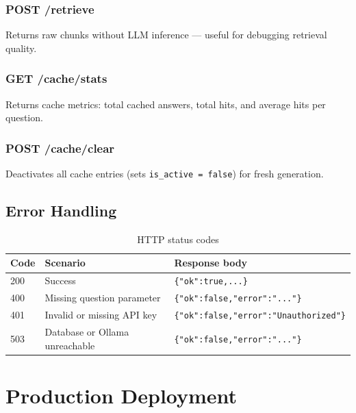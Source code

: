 \documentclass[12pt,a4paper]{report}
\begin{document}
\subsection{POST /retrieve}

Returns raw chunks without LLM inference --- useful for debugging retrieval quality.

\subsection{GET /cache/stats}

Returns cache metrics: total cached answers, total hits, and average hits per question.

\subsection{POST /cache/clear}

Deactivates all cache entries (sets \texttt{is\_active = false}) for fresh generation.

\section{Error Handling}

\begin{table}[H]
\centering
\caption{HTTP status codes}
\begin{tabular}{lll}
\toprule
\textbf{Code} & \textbf{Scenario} & \textbf{Response body} \\
\midrule
200 & Success                       & \texttt{\{"ok":true,...\}} \\
400 & Missing question parameter    & \texttt{\{"ok":false,"error":"..."\}} \\
401 & Invalid or missing API key    & \texttt{\{"ok":false,"error":"Unauthorized"\}} \\
503 & Database or Ollama unreachable & \texttt{\{"ok":false,"error":"..."\}} \\
\bottomrule
\end{tabular}
\end{table}

\chapter{Production Deployment}
\end{document}
